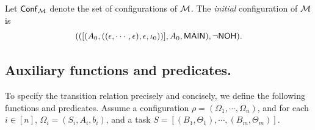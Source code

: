 Let ${\mathsf{Conf} }_{\mathcal{M} }$ denote the set of configurations of ${\mathcal{M} }$. The \emph{initial} configuration of ${\mathcal{M} }$ is 
$$(([(A_0,((\epsilon,\cdots,\epsilon),\epsilon,\iota_0))],A_0,{\sf MAIN}),\neg{\sf NOH}).$$
%

\subsection*{Auxiliary functions and predicates.} To specify the transition relation precisely and concisely, we define the following functions and predicates. 
%
Assume a configuration $\rho = (\Omega_1,\cdots,\Omega_n)$, and for each $i\in[n]$, $\Omega_i = (S_i,A_i,b_i)$, and a task $S=[(B_1, \Theta_1), \cdots, (B_m, \Theta_m)]$. 
